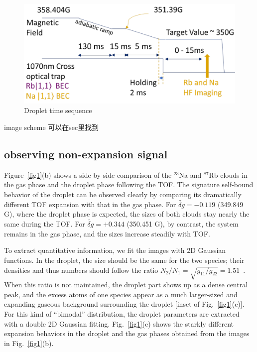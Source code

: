 \begin{figure}[hb]
\begin{center}
\includegraphics[width = 0.8\linewidth]{figures/Droplet_time-sequence.pdf}
\end{center}
\caption{Droplet time sequence}
\label{Droplet_time-sequence}
\end{figure}

image scheme 可以在sec里找到


\subsection{observing non-expansion signal}

Figure~\ref{fig1}(b) shows a side-by-side comparison of the $^{23}$Na and $^{87}$Rb clouds in the gas phase and the droplet phase following the TOF.
The signature self-bound behavior of the droplet can be observed clearly by comparing its dramatically different TOF expansion with that in the gas phase.
For $\widetilde{\delta g}=-0.119$ (349.849 G), where the droplet phase is expected, the sizes of both clouds stay nearly the same during the TOF.
For $\widetilde{\delta g}=+0.344$ (350.451 G), by contrast, the system remains in the gas phase, and the sizes increase steadily with TOF.

To extract quantitative information, we fit the images with 2D Gaussian functions.
In the droplet, the size should be the same for the two species; their densities and thus numbers should follow the ratio $N_{2}/N_{1} 
= \sqrt{g_{11}/g_{22}}=1.51$~\cite{petrov2015}. When this ratio is not maintained, the droplet part shows up as a dense central peak, and the excess atoms of one species appear as a much larger-sized and expanding gaseous background surrounding the droplet [inset of Fig.~\ref{fig1}(c)].
For this kind of ``bimodal'' distribution, the droplet parameters are extracted with a double 2D Gaussian fitting. Fig.~\ref{fig1}(c) shows the starkly different expansion behaviors in the droplet and the gas phases obtained from the images in Fig.~\ref{fig1}(b).

